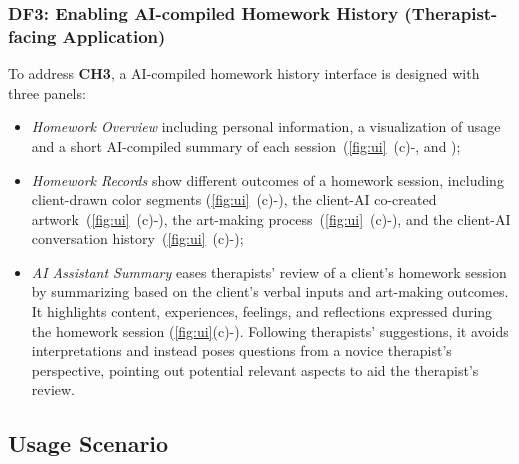 \subsubsection{\textbf{DF3}: Enabling AI-compiled Homework History (Therapist-facing Application)}
To address \textbf{CH3}, a AI-compiled homework history interface is designed with three panels:
\begin{itemize}
    \item \textit{Homework Overview} including personal information, a visualization of usage and a short AI-compiled summary of each session~(\autoref{fig:ui}~(c)-,  and ); 
    \item \textit{Homework Records} show different outcomes of a homework session, including client-drawn color segments (\autoref{fig:ui}~(c)-), the client-AI co-created artwork~(\autoref{fig:ui}~(c)-), the art-making process~(\autoref{fig:ui}~(c)-), and the client-AI conversation history~(\autoref{fig:ui}~(c)-); 
    \item \textit{AI Assistant Summary} eases therapists' review of a client's homework session by summarizing based on the client's verbal inputs and art-making outcomes. It highlights content, experiences, feelings, and reflections expressed during the homework session (\autoref{fig:ui}(c)-). Following therapists' suggestions, it avoids interpretations and instead poses questions from a novice therapist's perspective, pointing out potential relevant aspects to aid the therapist's review.
    
\end{itemize}



\subsection{\name{} Usage Scenario}

